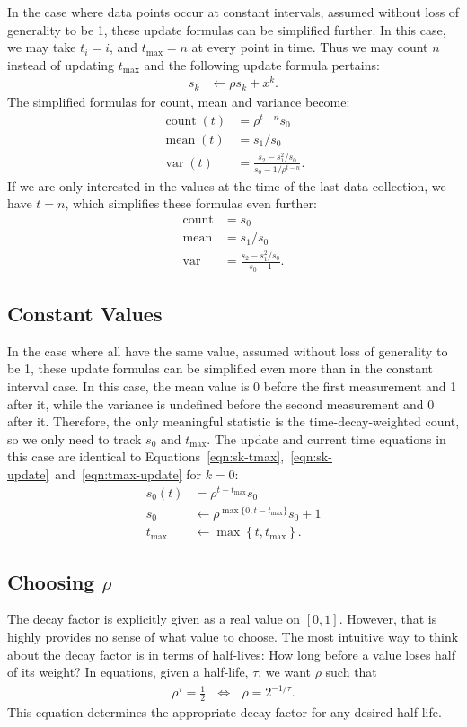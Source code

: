 \documentclass{article}
\DeclareMathOperator{\cnt}{count}
\DeclareMathOperator{\mean}{mean}
\DeclareMathOperator{\var}{var}
\newcommand{\tmax}{{t_\text{max}}}
\begin{document}
In the case where data points occur at constant intervals, assumed without loss of generality to be 1, these update formulas can be simplified further.
In this case, we may take $t_i = i$, and $\tmax = n$ at every point in time.
Thus we may count $n$ instead of updating $\tmax$ and the following update formula pertains:
\begin{align}
s_k &\leftarrow \rho s_k + x^k.
\end{align}
The simplified formulas for count, mean and variance become:
\begin{align}
\cnt(t) &= \rho^{t-n} s_0 \\
\mean(t) &= s_1/s_0 \\
\var(t) &= \frac{s_2 - s_1^2/s_0}{s_0-1/\rho^{t-n}}.
\end{align}
If we are only interested in the values at the time of the last data collection, we have $t = n$, which simplifies these formulas even further:
\begin{align}
\cnt &= s_0 \\
\mean &= s_1/s_0 \\
\var &= \frac{s_2 - s_1^2/s_0}{s_0-1}.
\end{align}

\subsection{Constant Values}

In the case where all have the same value, assumed without loss of generality to be 1, these update formulas can be simplified even more than in the constant interval case.
In this case, the mean value is 0 before the first measurement and 1 after it, while the variance is undefined before the second measurement and 0 after it.
Therefore, the only meaningful statistic is the time-decay-weighted count, so we only need to track $s_0$ and $\tmax$.
The update and current time equations in this case are identical to Equations~\ref{eqn:sk-tmax},~\ref{eqn:sk-update}~and~\ref{eqn:tmax-update} for $k=0$:
\begin{align}
\label{eqn:sk-tmax}
s_0(t) &= \rho^{t-\tmax} s_0 \\
s_0 &\leftarrow \rho^{\max\{0,t-\tmax\}} s_0 + 1 \\
\tmax &\leftarrow \max\left\{t,\tmax\right\}.
\end{align}

\subsection{Choosing $\rho$}

The decay factor is explicitly given as a real value on $[0,1]$.
However, that is highly provides no sense of what value to choose.
The most intuitive way to think about the decay factor is in terms of half-lives:
How long before a value loses half of its weight?
In equations, given a half-life, $\tau$, we want $\rho$ such that
\begin{align}
\rho^\tau = \frac{1}{2} ~~~ \iff ~~~ \rho = 2^{-1/\tau}.
\end{align}
This equation determines the appropriate decay factor for any desired half-life.
\end{document}
